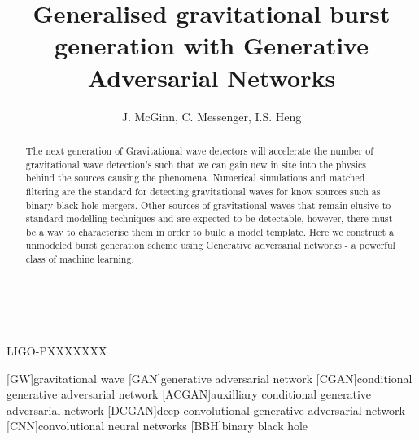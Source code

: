 \documentclass[12pt]{iopart}
\newcommand{\dcc}{LIGO-PXXXXXXX}
\begin{document}
\title{Generalised gravitational burst generation with Generative Adversarial Networks}

\author{J. McGinn, C. Messenger, I.S. Heng}

\address{University of Glasgow, Physics \& Astronomy Department, Glasgow G12 8QQ, UK}
\vspace{10pt}
\begin{indented}
\item[]\commitDATE\\\mbox{\small \commitID}\\\mbox{\dcc}
\end{indented}

\begin{abstract}
The next generation of Gravitational wave detectors will accelerate the number
of gravitational wave detection's such that we can gain new in site into the
physics behind the sources causing the phenomena. Numerical simulations and
matched filtering are the standard for detecting gravitational waves for know
sources such as binary-black hole mergers. Other sources of gravitational waves
that remain elusive to standard modelling techniques and are expected to be
detectable, however, there must be a way to characterise them in order to build
a model template. Here we construct a unmodeled burst generation scheme using
Generative adversarial networks - a powerful class of machine learning.
\end{abstract}

%
%
%
% 
%

[GW]{gravitational wave}
[GAN]{generative adversarial network}
[CGAN]{conditional generative adversarial network}
[ACGAN]{auxilliary conditional generative adversarial network}
[DCGAN]{deep convolutional generative adversarial network}
[CNN]{convolutional neural networks}
[BBH]{binary black hole}
\end{document}
